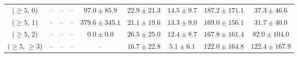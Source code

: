 \begin{table}[h!]
{\begin{tabular}{ccccccccc}
	($\ge5$, 0) & -- & -- & -- & $97.0\pm 85.9$ & $22.9\pm 21.3$ & $14.5\pm 9.7$ & $187.2\pm 171.1$ & $37.3\pm 46.6$ \\[0.5ex] 
	($\ge5$, 1) & -- & -- & -- & $379.6\pm 345.1$ & $21.1\pm 19.6$ & $13.3\pm 9.0$ & $169.0\pm 156.1$ & $31.7\pm 40.0$ \\[0.5ex] 
	($\ge5$, 2) & -- & -- & -- & $0.0\pm 0.0$ & $26.5\pm 25.0$ & $12.4\pm 8.7$ & $167.8\pm 161.4$ & $82.0\pm 104.0$ \\[0.5ex] 
	($\ge5$, $\ge3$) & -- & -- & -- & -- & $16.7\pm 22.8$ & $5.1\pm 6.1$ & $122.0\pm 164.8$ & $122.4\pm 167.9$ \\[0.5ex] 
	\hline
	\hline
\end{tabular}}
\end{table}
